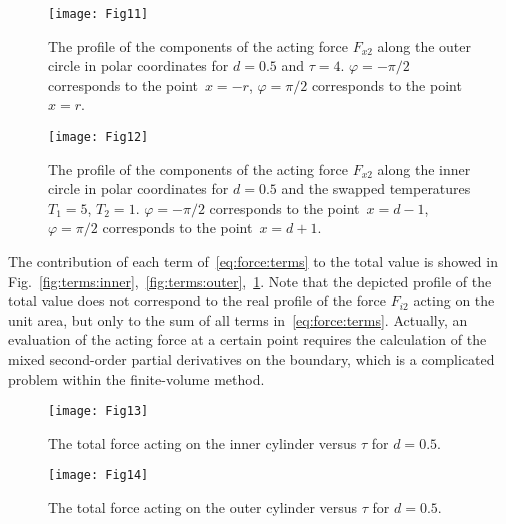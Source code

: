 \documentclass[smallextended, final]{svjour3} %
\begin{document}
\begin{figure}[ht]
    \centering
    \begin{minipage}{.48\textwidth}
        \centering
        \texttt{[image: Fig11]}
        \caption{The profile of the components of the acting force \(F_{x2}\) along
                the outer circle in polar coordinates for \(d=0.5\) and \(\tau=4\).
                \(\varphi = -\pi/2\) corresponds to the point~\(x=-r\),
                \(\varphi = \pi/2\) corresponds to the point~\(x=r\).}
        \label{fig:terms:outer}
    \end{minipage}
    \quad
    \begin{minipage}{.48\textwidth}
        \centering
        \texttt{[image: Fig12]}
        \caption{The profile of the components of the acting force \(F_{x2}\)
                along the inner circle in polar coordinates
                for \(d=0.5\) and the swapped temperatures \(T_1 = 5\), \(T_2 = 1\).
                \(\varphi = -\pi/2\) corresponds to the point~\(x=d-1\),
                \(\varphi = \pi/2\) corresponds to the point~\(x=d+1\).}
        \label{fig:terms:inner-swap}
    \end{minipage}
\end{figure}

The contribution of each term of~\eqref{eq:force:terms} to the total value is showed
in Fig.~\ref{fig:terms:inner},~\ref{fig:terms:outer},~\ref{fig:terms:inner-swap}.
Note that the depicted profile of the total value does not correspond to the real profile of the force \(F_{i2}\)
acting on the unit area, but only to the sum of all terms in~\eqref{eq:force:terms}.
Actually, an evaluation of the acting force at a certain point requires the calculation
of the mixed second-order partial derivatives on the boundary,
which is a complicated problem within the finite-volume method.

\begin{figure}[ht]
    \centering
    \begin{minipage}{.48\textwidth}
        \centering
        \texttt{[image: Fig13]}
        \caption{The total force acting on the inner cylinder versus \(\tau\) for \(d=0.5\).}
        \label{fig:tau:force-inner}
    \end{minipage}
    \quad
    \begin{minipage}{.48\textwidth}
        \centering
        \texttt{[image: Fig14]}
        \caption{The total force acting on the outer cylinder versus \(\tau\) for \(d=0.5\).}
        \label{fig:tau:force-outer}
    \end{minipage}
\end{figure}
\end{document}
